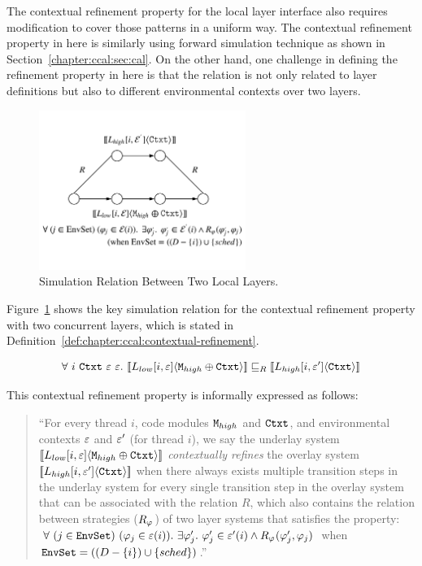 The contextual refinement property for the local layer interface also requires 
modification to cover those patterns in a uniform way. 
The contextual refinement property in here is similarly using forward simulation technique as shown in  
Section~\ref{chapter:ccal:sec:cal}.
On the other hand, one challenge in defining the refinement property in here is that the relation is not only related to layer definitions but also  to different environmental contexts over two layers. 
\begin{figure}
\begin{center}
\includegraphics[width=0.6\textwidth]{figs/ccal/locallayerrefinement}
\end{center}
\caption{Simulation Relation Between Two Local Layers.}
\label{fig:chapter:ccal:refinement-between-two-layers}
\end{figure}
Figure~\ref{fig:chapter:ccal:refinement-between-two-layers} shows the key simulation relation for 
the contextual refinement property with two concurrent layers, which is stated  in Definition~\ref{def:chapter:ccal:contextual-refinement}.
\begin{definition}
\label{def:chapter:ccal:contextual-refinement}
$$
\forall \ i\  \codeinmath{Ctxt} \ \oracle \ \oracle .\ \sem{L_{low}[i, \oracle]}{\codeinmath{M}_{high} \oplus \codeinmath{Ctxt}} \refines_R \sem{L_{high}[i, \oracle']}{\codeinmath{Ctxt}}
$$
\end{definition}
This contextual refinement property is informally expressed as follows:
\begin{quote}
``For every thread $i$,  code modules ${\mathrm{\texttt{M}}}_{high}$ and  ${\mathrm{\texttt{Ctxt}}}$,  and environmental contexts
  ${\varepsilon}$ and ${\varepsilon}'$ (for thread $i$), we say the underlay system   $[\![{L_{low}[i, {\varepsilon}]} \langle {{\mathrm{\texttt{M}}}_{high} \oplus {\mathrm{\texttt{Ctxt}}}} \rangle]\!]$
     \textit{contextually
 refines} the overlay system $ [\![{L_{high}[i, {\varepsilon}']} \langle {{\mathrm{\texttt{Ctxt}}}} \rangle]\!]$ when there always exists 
 multiple  transition steps in the underlay system for every  single  transition step
  in the overlay system that can be associated with the relation $R$,
which also contains the relation between strategies ($R_{\varphi_{}}$)
 of two layer systems that satisfies the property:
$\forall\ (j \in \codeinmath{EnvSet})\ 
(\strat{j} \in \oracle(i)) .\ \exists \stratp{j} . \ \stratp{j} \in \oracle'(i) \wedge R_{\strat{}}(\stratp{j}, \strat{j})$ when 
${\mathrm{\texttt{EnvSet}}} = ((D - \{ i\}) \cup \{ sched\})$.''
\end{quote}

